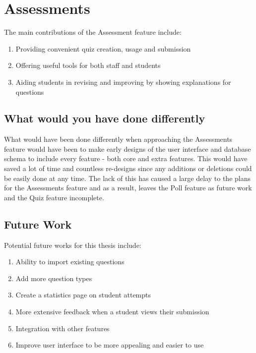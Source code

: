\section{Assessments}

The main contributions of the Assessment feature include:

\begin{enumerate}
	\item Providing convenient quiz creation, usage and submission
	\item Offering useful tools for both staff and students
	\item Aiding students in revising and improving by showing explanations for questions
\end{enumerate}

\subsection{What would you have done differently}
What would have been done differently when approaching the Assessments feature would have been to make early designs of the user interface and database schema to include every feature - both core and extra features. This would have saved a lot of time and countless re-designs since any additions or deletions could be easily done at any time. The lack of this has caused a large delay to the plans for the Assessments feature and as a result, leaves the Poll feature as future work and the Quiz feature incomplete. 

\subsection{Future Work}
Potential future works for this thesis include:

\begin{enumerate}
	\item Ability to import existing questions 
	\item Add more question types
	\item Create a statistics page on student attempts
	\item More extensive feedback when a student views their submission
	\item Integration with other features
	\item Improve user interface to be more appealing and easier to use
\end{enumerate}    